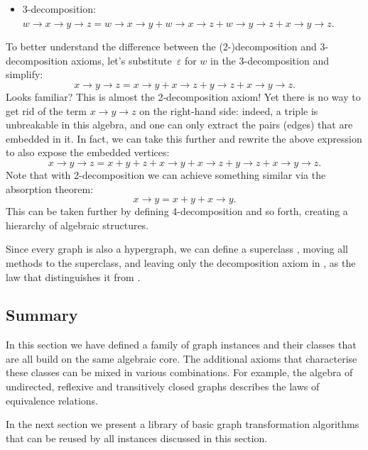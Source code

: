 \begin{itemize}
    \item 3-decomposition: $w \rightarrow x \rightarrow y \rightarrow z =
    w \rightarrow x \rightarrow y + w \rightarrow x \rightarrow z +
    w \rightarrow y \rightarrow z + x \rightarrow y \rightarrow z$.
\end{itemize}

To better understand the difference between the (2-)decomposition and 3-decomposition
axioms, let's substitute~$\varepsilon$ for $w$ in the 3-decomposition and simplify:
\[
x \rightarrow y \rightarrow z = x \rightarrow y + x \rightarrow z + y \rightarrow z
+ x \rightarrow y \rightarrow z.
\]
Looks familiar? This is almost the 2-decomposition axiom! Yet there is no way to get rid
of the term $x \rightarrow y \rightarrow z$ on the right-hand side: indeed, a triple is
unbreakable
in this algebra, and one can only extract the pairs (edges) that are embedded in it.
In fact, we can take this further and rewrite the above expression to also expose the
embedded vertices:
\[
x \rightarrow y \rightarrow z = x + y + z + x \rightarrow y + x \rightarrow z
+ y \rightarrow z + x \rightarrow y \rightarrow z.
\]
Note that with 2-decomposition we can achieve something similar via the absorption theorem:
\[
x \rightarrow y = x + y + x \rightarrow y.
\]
This can be taken further by defining 4-decomposition and so forth, creating a hierarchy
of algebraic structures.

Since every graph is also a hypergraph, we can define a superclass
, moving all  methods to the superclass, and
leaving only the decomposition axiom in , as the law that distinguishes it from
.

\subsection{Summary}

In this section we have defined a family of graph instances and their classes that are all
build on the same algebraic core. The additional axioms that characterise these classes
can be mixed in various combinations. For example, the algebra of undirected, reflexive
and transitively closed graphs describes the laws of equivalence relations.

In the next section we present a library of basic graph transformation algorithms that
can be reused by all instances discussed in this section.
